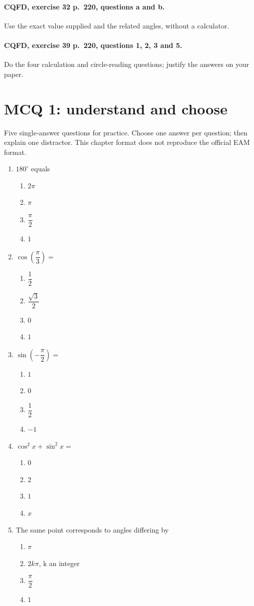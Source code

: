 \paragraph{CQFD, exercise 32 p.~220, questions a and b.}\label{C10-M1} Use the exact value supplied and the related angles, without a calculator.
\paragraph{CQFD, exercise 39 p.~220, questions 1, 2, 3 and 5.}\label{C10-M2} Do the four calculation and circle-reading questions; justify the answers on your paper.
\begingroup\small
\clearpage\section*{MCQ 1: understand and choose}\label{C10-Q1}
Five single-answer questions for practice. Choose one answer per question; then explain one distractor. This chapter format does not reproduce the official EAM format.
\begin{enumerate}
\item $180^\circ$ equals
\begin{enumerate}[label=\Alph*.,itemsep=2pt]
\item $2\pi$
\item $\pi$
\item $\dfrac{\pi}{2}$
\item $1$
\end{enumerate}
\item $\cos (\dfrac{\pi}{3})=$
\begin{enumerate}[label=\Alph*.,itemsep=2pt]
\item $\dfrac{1}{2}$
\item $\dfrac{\sqrt 3}{2}$
\item $0$
\item $1$
\end{enumerate}
\item $\sin (-\dfrac{\pi}{2})=$
\begin{enumerate}[label=\Alph*.,itemsep=2pt]
\item $1$
\item $0$
\item $\dfrac{1}{2}$
\item $-1$
\end{enumerate}
\item $\cos^2x+\sin^2x=$
\begin{enumerate}[label=\Alph*.,itemsep=2pt]
\item $0$
\item $2$
\item $1$
\item $x$
\end{enumerate}
\item The same point corresponds to angles differing by
\begin{enumerate}[label=\Alph*.,itemsep=2pt]
\item $\pi$
\item $2k\pi$, k an integer
\item $\dfrac{\pi}{2}$
\item $1$
\end{enumerate}
\end{enumerate}
